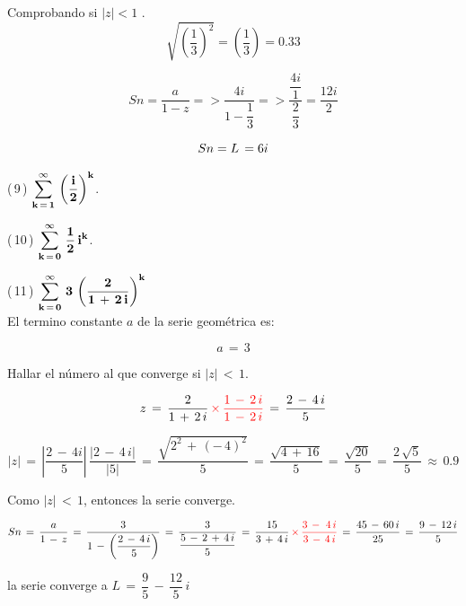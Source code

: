 \documentclass[a4paper,11pt,openany]{book}
\begin{document}
\providecommand{\abs}[1]{\lvert#1\rvert} 

Comprobando si $\abs{z} < 1$
.\\

$$\sqrt{\left( \dfrac{1}{3} \right)^{2}}= \left( \dfrac{1}{3} \right) = 0.33$$

$$ Sn = \dfrac{a}{1-z} => \dfrac{4i}{1-\dfrac{1}{3}} => \dfrac{\dfrac{4i}{1}}{\dfrac{2}{3}} = \dfrac{12i}{2}$$

$$ Sn = \mathnormal{L}\,= 6i $$

\textcolor{ao(english)}{(\,9\,)} $\bf{\displaystyle\sum\limits_{k\,=\,1}^{\infty}\,\left(\dfrac{i}{2}\right)^{k}}$.

\textcolor{ao(english)}{(\,10\,)} $\bf{\displaystyle\sum\limits_{k\,=\,0}^{\infty}\,\dfrac{1}{2}\,i^{k}}$.

\textcolor{ao(english)}{(\,11\,)} $\bf{\displaystyle\sum\limits_{k\,=\,0}^{\infty}\,3\,\left(\dfrac{2}{1\,+\,2\,i}\right)^{k}}$\\

\textcolor{ao(english)}{} El termino constante $a$ de la serie geométrica es:

$$a\,=\,3$$

\textcolor{ao(english)}{} Hallar el número al que converge si $|z|\,<\,1$.

$$z\,=\,\dfrac{2}{1\,+\,2\,i}\,\textcolor{red}{\times\,\dfrac{1\,-\,2\,i}{1\,-\,2\,i}}\,=\,\dfrac{2\,-\,4\,i}{5}$$

$$|z|\,=\,\left|\dfrac{2\,-\,4i}{5}\right|\,\dfrac{|2\,-\,4\,i|}{|5|}\,=\,\dfrac{\sqrt{2^{2}\,+\,(-\,4)^{2}}}{5}\,=\,\dfrac{\sqrt{4\,+\,16}}{5}\,=\,\dfrac{\sqrt{20}}{5}\,=\,\dfrac{2\,\sqrt{5}}{5}\,\approx\,0.9$$

\textcolor{ao(english)}{} Como $|z|\,<\,1$, entonces la serie converge.

$$Sn\,=\,\dfrac{a}{1\,-\,z}\,=\,\dfrac{3}{1\,-\,\left(\dfrac{2\,-\,4\,i}{5}\right)}\,=\,\dfrac{3}{\dfrac{5\,-\,2\,+\,4\,i}{5}}\,=\,\dfrac{15}{3\,+\,4\,i}\,\textcolor{red}{\times\,\dfrac{3\,-\,\,4\,i}{3\,-\,4\,i}}\,=\,\dfrac{45\,-\,60\,i}{25}\,=\,\dfrac{9\,-\,12\,i}{5}$$

la serie converge a $L\,=\,\dfrac{9}{5}\,-\,\dfrac{12}{5}\,i$
\end{document}
